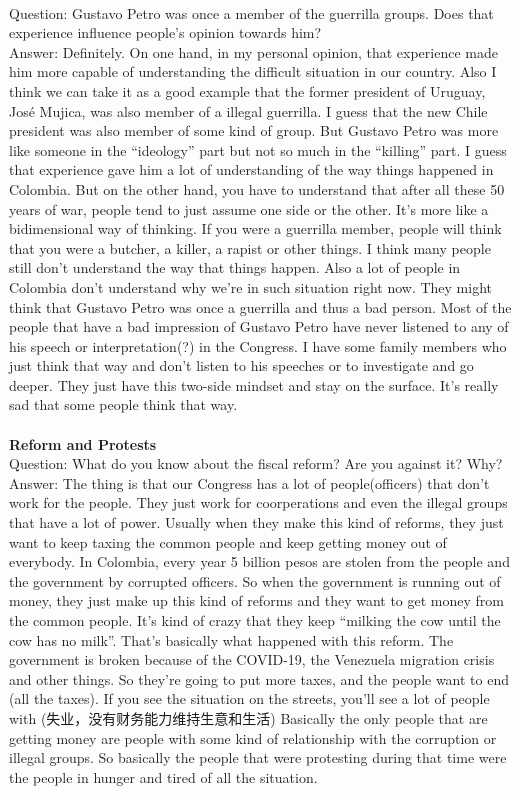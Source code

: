 \documentclass{phyasgn}\usepackage{nag}
\begin{document}
\\
Question: Gustavo Petro was once a member of the guerrilla groups. Does that experience influence people’s opinion towards him?\\
Answer: Definitely. On one hand, in my personal opinion, that experience made him more capable of understanding the difficult situation in our country. Also I think we can take it as a good example that the former president of Uruguay, José Mujica, was also member of a illegal guerrilla. I guess that the new Chile president was also member of some kind of group. But Gustavo Petro was more like someone in the “ideology” part but not so much in the “killing” part. I guess that experience gave him a lot of understanding of the way things happened in Colombia. But on the other hand, you have to understand that after all these 50 years of war, people tend to just assume one side or the other. It’s more like a bidimensional way of thinking. If you were a guerrilla member, people will think that you were a butcher, a killer, a rapist or other things. I think many people still don’t understand the way that things happen. Also a lot of people in Colombia don’t understand why we’re in such situation right now. They might think that Gustavo Petro was once a guerrilla and thus a bad person. Most of the people that have a bad impression of Gustavo Petro have never listened to any of his speech or interpretation(?) in the Congress. I have some family members who just think that way and don’t listen to his speeches or to investigate and go deeper. They just have this two-side mindset and stay on the surface. It’s really sad that some people think that way.\\
\\
\textbf{Reform and Protests}\\
Question: What do you know about the fiscal reform? Are you against it? Why?\\
Answer: The thing is that our Congress has a lot of people(officers) that don’t work for the people. They just work for coorperations and even the illegal groups that have a lot of power. Usually when they make this kind of reforms, they just want to keep taxing the common people and keep getting money out of everybody. In Colombia, every year 5 billion pesos are stolen from the people and the government by corrupted officers. So when the government is running out of money, they just make up this kind of reforms and they want to get money from the common people. It’s kind of crazy that they keep “milking the cow until the cow has no milk”. That’s basically what happened with this reform. The government is broken because of the COVID-19, the Venezuela migration crisis and other things. So they’re going to put more taxes, and the people want to end (all the taxes). If you see the situation on the streets, you’ll see a lot of people with (失业，没有财务能力维持生意和生活) Basically the only people that are getting money are people with some kind of relationship with the corruption or illegal groups. So basically the people that were protesting during that time were the people in hunger and tired of all the situation. \\
\end{document}
